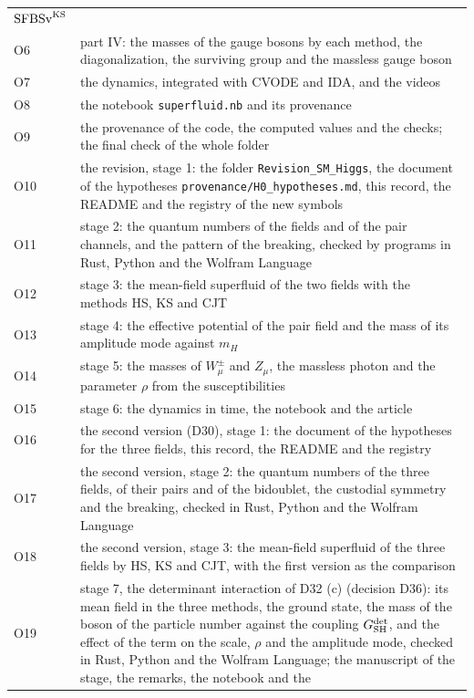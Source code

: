 \documentclass[
  10pt,
]{article}
\begin{document}
\begin{longtable}[]{@{}
  >{\raggedright\arraybackslash}p{}
  >{\raggedright\arraybackslash}p{}@{}}
\(\mathrm{SFBSv}^{\rm KS}\) \\
O6 & part IV: the masses of the gauge bosons by each method, the
diagonalization, the surviving group and the massless gauge boson \\
O7 & the dynamics, integrated with CVODE and IDA, and the videos \\
O8 & the notebook \texttt{superfluid.nb} and its provenance \\
O9 & the provenance of the code, the computed values and the checks; the
final check of the whole folder \\
O10 & the revision, stage 1: the folder \texttt{Revision\_SM\_Higgs},
the document of the hypotheses \texttt{provenance/H0\_hypotheses.md},
this record, the README and the registry of the new symbols \\
O11 & stage 2: the quantum numbers of the fields and of the pair
channels, and the pattern of the breaking, checked by programs in Rust,
Python and the Wolfram Language \\
O12 & stage 3: the mean-field superfluid of the two fields with the
methods HS, KS and CJT \\
O13 & stage 4: the effective potential of the pair field and the mass of
its amplitude mode against \(m_H\) \\
O14 & stage 5: the masses of \(W^\pm_\mu\) and \(Z_\mu\), the massless
photon and the parameter \(\rho\) from the susceptibilities \\
O15 & stage 6: the dynamics in time, the notebook and the article \\
O16 & the second version (D30), stage 1: the document of the hypotheses
for the three fields, this record, the README and the registry \\
O17 & the second version, stage 2: the quantum numbers of the three
fields, of their pairs and of the bidoublet, the custodial symmetry and
the breaking, checked in Rust, Python and the Wolfram Language \\
O18 & the second version, stage 3: the mean-field superfluid of the
three fields by HS, KS and CJT, with the first version as the
comparison \\
O19 & stage 7, the determinant interaction of D32 (c) (decision D36):
its mean field in the three methods, the ground state, the mass of the
boson of the particle number against the coupling
\(G^{\rm det}_{\rm SH}\), and the effect of the term on the scale,
\(\rho\) and the amplitude mode, checked in Rust, Python and the Wolfram
Language; the manuscript of the stage, the remarks, the notebook and the

\end{longtable}
\end{document}
